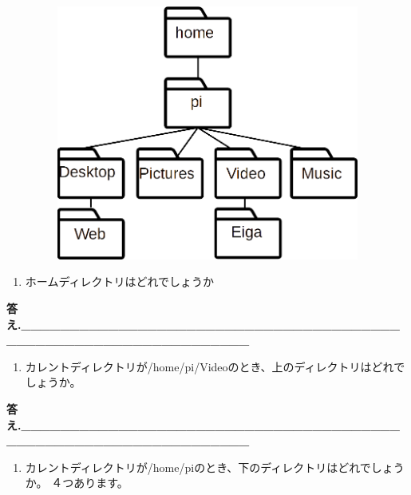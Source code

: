 \documentclass[a4paper,dvipdfmx]{jarticle}
\newcounter{saveenum}
\begin{document}
\begin{figure}
\centering
\includegraphics[width=11.742cm,height=8.384cm]{text03-img/text03-img005.png}
\end{figure}
\begin{enumerate}
\item
ホームディレクトリはどれでしょうか
\end{enumerate}

\bigskip


\bigskip

{\ttfamily\bfseries
答え.\_\_\_\_\_\_\_\_\_\_\_\_\_\_\_\_\_\_\_\_\_\_\_\_\_\_\_\_\_\_\_\_\_\_\_\_\_\_\_\_\_\_\_\_\_\_\_\_\_\_\_\_\_\_\_\_\_\_\_\_\_\_\_\_}


\bigskip

\setcounter{saveenum}{\value{enumi}}
\begin{enumerate}
\setcounter{enumi}{\value{saveenum}}
\item
カレントディレクトリが/home/pi/Videoのとき、上のディレクトリはどれでしょうか。
\end{enumerate}

\bigskip


\bigskip

{\ttfamily\bfseries
答え.\_\_\_\_\_\_\_\_\_\_\_\_\_\_\_\_\_\_\_\_\_\_\_\_\_\_\_\_\_\_\_\_\_\_\_\_\_\_\_\_\_\_\_\_\_\_\_\_\_\_\_\_\_\_\_\_\_\_\_\_\_\_\_\_}


\bigskip

\setcounter{saveenum}{\value{enumi}}
\begin{enumerate}
\setcounter{enumi}{\value{saveenum}}
\item
カレントディレクトリが/home/piのとき、下のディレクトリはどれでしょうか。\newline
４つあります。
\end{enumerate}
\end{document}

